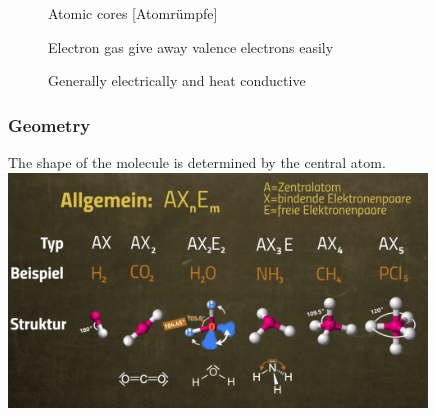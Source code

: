 \begin{description}
    \item[] Atomic cores [Atomrümpfe]
    \item[] Electron gas \arrow give away valence electrons easily
    \item[] Generally electrically and heat conductive
\end{description}

\subsubsection{Geometry}
The shape of the molecule is determined by the central atom.
\\
\includegraphics[width=30em]{./includes/chemistry/imgs/geometry.png}